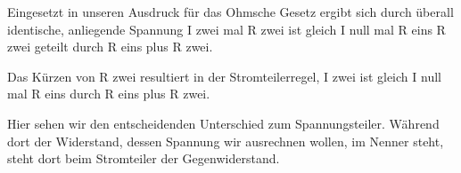 \begin{frame}
{{			Eingesetzt in unseren Ausdruck für das Ohmsche Gesetz ergibt sich durch überall identische, anliegende Spannung I zwei mal R zwei ist gleich
			I null mal R eins R zwei geteilt durch R eins plus R zwei. 
			
			Das Kürzen von R zwei resultiert in der Stromteilerregel,  I zwei ist gleich I null mal R eins durch R eins plus R zwei. 
			
			Hier sehen wir den entscheidenden Unterschied zum Spannungsteiler. Während dort der Widerstand, dessen Spannung wir ausrechnen wollen, im Nenner steht, steht dort beim Stromteiler der
			Gegenwiderstand.
		}
		
	}
	
\end{frame}






